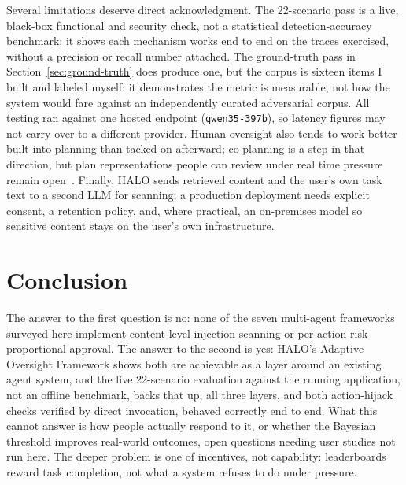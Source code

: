 \documentclass[a4paper, 11pt]{article}
\begin{document}
Several limitations deserve direct acknowledgment. The 22-scenario pass is a
live, black-box functional and security check, not a statistical
detection-accuracy benchmark; it shows each mechanism works end to end on the
traces exercised, without a precision or recall number attached. The
ground-truth pass in Section~\ref{sec:ground-truth} does produce one, but the
corpus is sixteen items I built and labeled myself: it demonstrates the metric is
measurable, not how the system would fare against an independently curated
adversarial corpus. All testing ran against one hosted endpoint
(\texttt{qwen35-397b}), so latency figures may not carry over to a different
provider. Human oversight also tends to work better built into planning than
tacked on afterward; co-planning is a step in that direction, but plan
representations people can review under real time pressure remain
open~\cite{amershi2019guidelines}. Finally, HALO sends retrieved content and the
user's own task text to a second LLM for scanning; a production deployment needs
explicit consent, a retention policy, and, where practical, an on-premises model
so sensitive content stays on the user's own infrastructure.

\section{Conclusion}

The answer to the first question is no: none of the seven multi-agent
frameworks surveyed here implement content-level injection scanning or
per-action risk-proportional approval. The answer to the second is yes: HALO's
Adaptive Oversight Framework shows both are achievable as a layer around an
existing agent system, and the live 22-scenario evaluation against the running
application, not an offline benchmark, backs that up, all three layers, and both
action-hijack checks verified by direct invocation, behaved correctly end to
end. What this cannot answer is how people actually respond to it, or whether
the Bayesian threshold improves real-world outcomes, open questions needing user
studies not run here. The deeper problem is one of incentives, not capability:
leaderboards reward task completion, not what a system refuses to do under
pressure.

\clearpage
\let\oldthebibliography\thebibliography
\renewcommand{\thebibliography}[1]{\oldthebibliography{#1}\scriptsize\setlength{\itemsep}{0pt}\setlength{\parsep}{0pt}}


\end{document}
